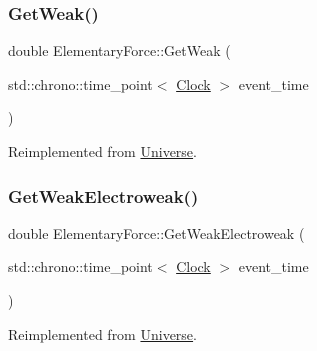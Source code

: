 \mbox{\label{classElementaryForce_a4669f2ce414e508c70ae4ce0df503ad1}} 
\subsubsection{\texorpdfstring{Get\+Weak()}{GetWeak()}}
{\footnotesize\ttfamily double Elementary\+Force\+::\+Get\+Weak (\begin{DoxyParamCaption}\item[{std\+::chrono\+::time\+\_\+point$<$ \mbox{\hyperlink{universe_8h_a0ef8d951d1ca5ab3cfaf7ab4c7a6fd80}{Clock}} $>$}]{event\+\_\+time }\end{DoxyParamCaption})\hspace{0.3cm}{\ttfamily [virtual]}}



Reimplemented from \mbox{\hyperlink{classUniverse_a4476b7e0a3fc1764909f556257fd9ec7}{Universe}}.

\mbox{\label{classElementaryForce_a928e06a1fa81b8d7ec4a426d959a0f98}} 
\subsubsection{\texorpdfstring{Get\+Weak\+Electroweak()}{GetWeakElectroweak()}}
{\footnotesize\ttfamily double Elementary\+Force\+::\+Get\+Weak\+Electroweak (\begin{DoxyParamCaption}\item[{std\+::chrono\+::time\+\_\+point$<$ \mbox{\hyperlink{universe_8h_a0ef8d951d1ca5ab3cfaf7ab4c7a6fd80}{Clock}} $>$}]{event\+\_\+time }\end{DoxyParamCaption})\hspace{0.3cm}{\ttfamily [virtual]}}



Reimplemented from \mbox{\hyperlink{classUniverse_a645299738e6b798a037f2a15a2e7cf4d}{Universe}}.

\mbox{\label{classElementaryForce_aa5ab479744dbf3e8578f8d2974299ff7}} 
